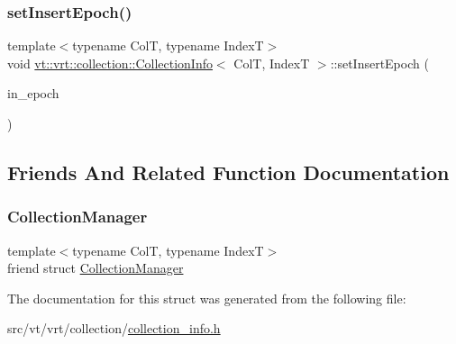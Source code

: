\subsubsection{\texorpdfstring{set\+Insert\+Epoch()}{setInsertEpoch()}}
{\footnotesize\ttfamily template$<$typename ColT, typename IndexT$>$ \\
void \hyperlink{structvt_1_1vrt_1_1collection_1_1_collection_info}{vt\+::vrt\+::collection\+::\+Collection\+Info}$<$ ColT, IndexT $>$\+::set\+Insert\+Epoch (\begin{DoxyParamCaption}\item[{\hyperlink{namespacevt_a985a5adf291c34a3ca263b3378388236}{Epoch\+Type} const \&}]{in\+\_\+epoch }\end{DoxyParamCaption})\hspace{0.3cm}{\ttfamily [inline]}}



\subsection{Friends And Related Function Documentation}
\mbox{\label{structvt_1_1vrt_1_1collection_1_1_collection_info_af9288b1963f434a90b307b5305a49510}} 
\subsubsection{\texorpdfstring{Collection\+Manager}{CollectionManager}}
{\footnotesize\ttfamily template$<$typename ColT, typename IndexT$>$ \\
friend struct \hyperlink{structvt_1_1vrt_1_1collection_1_1_collection_manager}{Collection\+Manager}\hspace{0.3cm}{\ttfamily [friend]}}



The documentation for this struct was generated from the following file\+:\begin{DoxyCompactItemize}
\item 
src/vt/vrt/collection/\hyperlink{collection__info_8h}{collection\+\_\+info.\+h}\end{DoxyCompactItemize}
